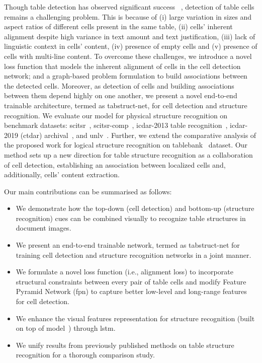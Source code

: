 \documentclass[runningheads]{llncs}
\begin{document}
Though table detection has observed significant success ~\cite{li2019tablebank,gilani2017table,dong2019tablesense,kavasidis2019saliency,ranajit_2019}, detection of table cells remains a challenging problem. This is because of (i) large variation in sizes and aspect ratios of different cells present in the same table, (ii) cells' inherent alignment despite high variance in text amount and text justification, (iii) lack of linguistic context in cells' content, (iv) presence of empty cells and (v) presence of cells with multi-line content. To overcome these challenges, we introduce a novel loss function that models the inherent alignment of cells in the cell detection network; and a graph-based problem formulation to build associations between the detected cells. Moreover, as detection of cells and building associations between them depend highly on one another, we present a novel end-to-end trainable architecture, termed as {\sc t}ab{\sc s}truct-{\sc n}et, for cell detection and structure recognition. We evaluate our model for physical structure recognition on benchmark datasets: {\sc s}ci{\sc tsr}~\cite{chi2019complicated}, {\sc s}ci{\sc tsr-comp}~\cite{chi2019complicated}, {\sc icdar}-2013 table recognition~\cite{gobel2013icdar}, {\sc icdar}-2019 (c{\sc td}a{\sc r}) archival~\cite{gao2019icdar}, and {\sc unlv}~\cite{shahab2010open}. Further, we extend the comparative analysis of the proposed work for logical structure recognition on {\sc t}able{\sc b}ank~\cite{li2019tablebank} dataset. Our method sets up a new direction for table structure recognition as a collaboration of cell detection, establishing an association between localized cells and, additionally, cells' content extraction.

Our main contributions can be summarised as follows:
\begin{itemize}
\item We demonstrate how the top-down (cell detection) and bottom-up (structure recognition) cues can be combined visually to recognize table structures in document images.
\item We present an end-to-end trainable network, termed as {\sc t}ab{\sc s}truct-{\sc n}et for training cell detection and structure recognition networks in a joint manner.
\item We formulate a novel loss function (i.e., alignment loss) to incorporate structural constraints between every pair of table cells and modify Feature Pyramid Network ({\sc fpn}) to capture better low-level and long-range features for cell detection.
\item We enhance the visual features representation for structure recognition (built on top of model~\cite{qasim2019rethinking}) through {\sc lstm}.
\item We unify results from previously published methods on table structure recognition for a thorough comparison study.
\end{itemize}
\end{document}
